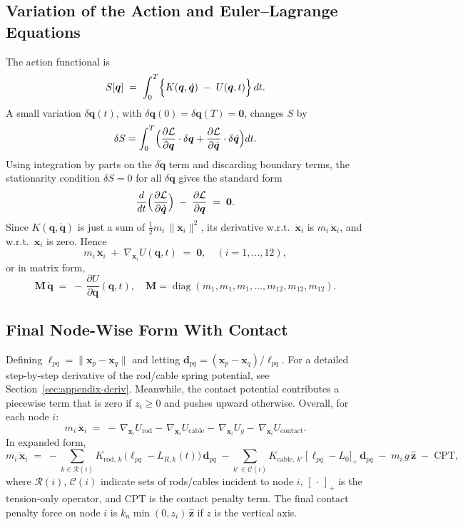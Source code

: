 \documentclass[12pt,letterpaper]{article}
\newcommand{\q}{\bm{q}}
\newcommand{\qd}{\dot{\bm{q}}}
\newcommand{\qdd}{\ddot{\bm{q}}}
\newcommand{\x}{\bm{x}}
\newcommand{\Lag}{\mathcal{L}}
\newcommand{\Mass}{\mathbf{M}}
\DeclareMathOperator{\diag}{diag}
\begin{document}
\subsection{Variation of the Action and Euler--Lagrange Equations}
The action functional is
\[
  S[\q]
   \;=\;\int_0^T \Bigl\{K(\q,\qd)\;-\;U(\q,t)\Bigr\}\,dt.
\]
A small variation $\delta \q(t)$, with $\delta\q(0)=\delta\q(T)=\bm{0}$, changes $S$ by
\[
  \delta S
    = \int_0^T\Bigl(
       \frac{\partial \Lag}{\partial \q}\cdot\delta \q
       + \frac{\partial \Lag}{\partial \qd}\cdot\delta \qd
      \Bigr)dt.
\]
Using integration by parts on the $\delta\qd$ term and discarding boundary terms, the stationarity condition $\delta S=0$ for all $\delta\q$ gives the standard form
\[
  \frac{d}{dt}\Bigl(\frac{\partial \Lag}{\partial \qd}\Bigr)
    \;-\;\frac{\partial \Lag}{\partial \q}
   \;=\;\bm{0}.
\]
Since $K(\q,\qd)$ is just a sum of $\tfrac12 m_i\,\|\dot{\x}_i\|^2$, its derivative w.r.t.\ $\dot{\x}_i$ is $m_i\,\dot{\x}_i$, and w.r.t.\ $\x_i$ is zero.  Hence
\[
  m_i\,\ddot{\x}_i \;+\;\nabla_{\!\x_i} U(\q,t) \;=\;\bm{0},
  \quad (i=1,\dots,12),
\]
or in matrix form,
\[
  \Mass\,\qdd
   \;=\;-\,\frac{\partial U}{\partial \q}(\q,t),
   \quad
   \Mass=\diag(m_1,m_1,m_1,\dots,m_{12},m_{12},m_{12}).
\]

\subsection{Final Node-Wise Form With Contact}
Defining $\ell_{pq}=\|\x_p-\x_q\|$ and letting $\bm{d}_{pq}=(\x_p-\x_q)/\ell_{pq}$. For a detailed step-by-step derivative of the rod/cable spring potential, see Section~\ref{sec:appendix-deriv}. Meanwhile, the contact potential contributes a piecewise term that is zero if $z_i\ge0$ and pushes upward otherwise.  Overall, for each node $i$:
\begin{equation}
  m_i\,\ddot{\x}_i
   \;=\; -\,\nabla_{\!\x_i}U_{\mathrm{rod}}
          -\,\nabla_{\!\x_i}U_{\mathrm{cable}}
          -\,\nabla_{\!\x_i}U_g
          -\,\nabla_{\!\x_i}U_{\mathrm{contact}}.
  \label{eq:nodewise-main}
\end{equation}
In expanded form,
\[
  m_i\,\ddot{\x}_i
    \;=\;
    -\sum_{k\in\mathcal{R}(i)} K_{\text{rod},\,k}\,\bigl(\ell_{pq}-L_{R,k}(t)\bigr)\,\bm{d}_{pq}
    \;-\sum_{k'\in\mathcal{C}(i)}
      K_{\text{cable},\,k'}\,[\,\ell_{pq}-L_{0}\bigr]_+\,\bm{d}_{pq}
    \;-\;m_i\,g\,\hat{\bm{z}}
    \;-\;\mathrm{CPT},
\]
where $\mathcal{R}(i)$, $\mathcal{C}(i)$ indicate sets of rods/cables incident to node $i$, $[\,\cdot\,]_+$ is the tension-only operator, and $\mathrm{CPT}$ is the contact penalty term.  The final contact penalty force on node $i$ is $k_n\min(0,z_i)\,\hat{\bm{z}}$ if $z$ is the vertical axis.
\end{document}
